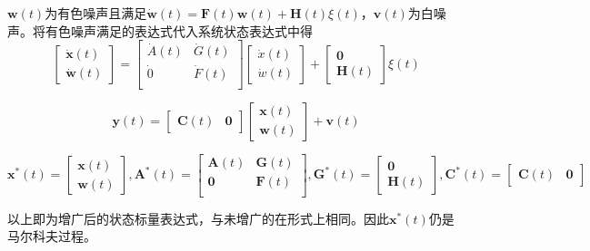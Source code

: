 \documentclass[11pt,a4paper]{ctexart}
\begin{document}
            $\bm w(t)$为有色噪声且满足$\bm{\dot w}(t)=\bm F(t)\bm w(t)+\bm H(t)\xi(t)$，$\bm v(t)$为白噪声。将有色噪声满足的表达式代入系统状态表达式中得
            \[
            \begin{bmatrix}
                \bm{\dot x}(t)\\ \bm{\dot w}(t)
            \end{bmatrix}
            =\begin{bmatrix}
                \dot A(t) & \dot G(t)\\
                \dot 0 & \dot F(t)\\
            \end{bmatrix}
            \begin{bmatrix}
                \dot x(t) \\ \dot w(t)
            \end{bmatrix}
            +\begin{bmatrix}
                \bm 0\\\bm H(t)
            \end{bmatrix}\xi(t)
            \]
            
            \[
            \bm y(t)=\begin{bmatrix}\bm C(t)&\bm0\end{bmatrix}
            \begin{bmatrix}
                \bm x(t) \\ \bm w(t)
            \end{bmatrix}
            +\bm v(t)
            \]

            \[
            \bm x^*(t)=\begin{bmatrix}\bm x(t) \\ \bm w(t)\end{bmatrix},
            \bm A^*(t)=\begin{bmatrix}
                \bm A(t) & \bm G(t)\\
                \bm 0 & \bm F(t)\\
            \end{bmatrix},
            \bm G^*(t)=\begin{bmatrix}\bm 0\\\bm H(t)\end{bmatrix},
            \bm C^*(t)=\begin{bmatrix}\bm C(t)&\bm0\end{bmatrix}
            \]

            以上即为增广后的状态标量表达式，与未增广的在形式上相同。因此$\bm x^*(t)$仍是马尔科夫过程。
\end{document}
